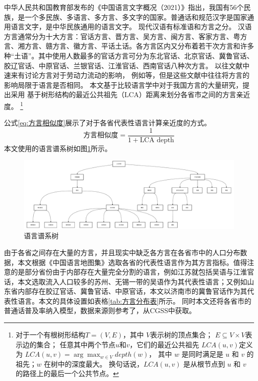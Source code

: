 \documentclass[
  a4paper,
  zihao=-4,
  fontset=mac,
  AutoFakeBold,
  AutoFakeSlant,
  oneside]{ctexbook}
\let\oldfootnote\footnote
\renewcommand{\footnote}[1]{%
  \oldfootnote{\setstretch{1.5}#1}%
}
\begin{document}
中华人民共和国教育部发布的《中国语言文字概况（2021）》指出，我国有56个民族，是一个多民族、多语言、多方言、多文字的国家。普通话和规范汉字是国家通用语言文字，是中华民族通用的语言文字。
现代汉语有标准语和方言之分。
汉语方言通常分为十大方言：官话方言、晋方言、吴方言、闽方言、客家方言、粤方言、湘方言、赣方言、徽方言、平话土话。各方言区内又分布着若干次方言和许多种“土语”。其中使用人数最多的官话方言可分为东北官话、北京官话、冀鲁官话、胶辽官话、中原官话、兰银官话、江淮官话、西南官话八种次方言。
以往文献中速来有讨论方言对于劳动力流动的影响，
例如\textcite{HuangZongYeFangYanDuiShengJiRenKouQianYiDeYingXiang2020,LiQinFangYanPuTongHuaYuZhongGuoLaoDongLiQuYuLiuDong2014}等，但是这些文献中往往将方言的影响局限于语言是否相同。
本文基于比较语言学中对于我国方言的大量研究，提出采用
基于树形结构的最近公共祖先（LCA）距离来划分各省市之间的方言亲近度。
\footnote{
对于一个有根树形结构$T=(V,E)$，其中
$V$表示树的顶点集合；
$E\subseteq V \times V$表示边的集合；
任意其中两个节点$u$和$v$，它们的最近公共祖先 $LCA(u,v) $定义为
$LCA(u,v)=\arg \max_{w\in V} depth(w)$，
其中 $w$ 是同时满足是 $u$ 和 $v$ 的祖先；$w$ 在树中的深度最大。
换句话说，$LCA(u,v)$ 是从根节点到 $u$ 和 $v$ 的路径上的最后一个公共节点。
}
公式\ref{eq:方言相似度}展示了对于各省代表性语言计算亲近度的方式。
\begin{equation}
  \label{eq:方言相似度}
  \text{方言相似度}=\frac{1}{1+\text{LCA depth}}
\end{equation}
本文使用的语言谱系树如图\ref{fig:linguistic_tree}所示。
\begin{figure}[!ht]
\centering
\caption{语言谱系树}
\label{fig:linguistic_tree}
\includegraphics[width=\textwidth]{images/linguisitc_tree.drawio.pdf}
\end{figure}
由于各省之间存在大量的方言，并且现实中缺乏各方言在各省市中的人口分布数据，本文根据《中国语言地图集》选取各省的代表性语言作为其方言指标。值得注意的是部分省份由于内部存在大量完全分割的语言，例如江苏就包括吴语与江淮官话，本文选取流入人口较多的苏州、无锡一带的吴语作为其代表性语言；又例如山东省内部存在胶辽官话、冀鲁官话、中原官话，本文以济南市的冀鲁官话作为其代表性语言。本文的具体设置如表格\ref{tab:方言分布表}所示。
同时本文还将各省市的普通话普及率纳入模型，数据来源则参考了\textcite{YuWeiQiGuoMinPuTongHuaNengLiDeJiBenZhuangKuangYuFaZhanTaiShi2018}，从CGSS中获取。
\end{document}

